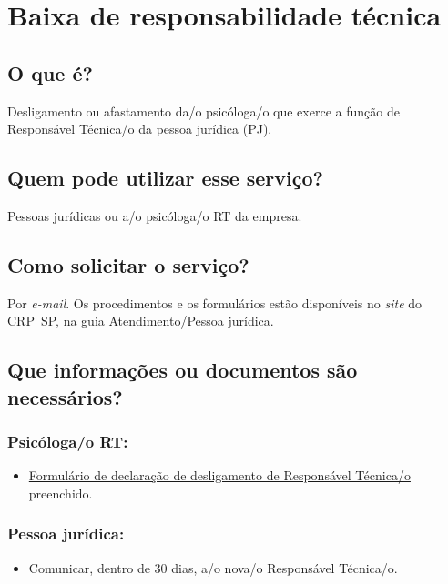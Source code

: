 \chapter{Baixa de responsabilidade técnica}
\label{chap:pj-baixa_rt}

\section{O que é?}

Desligamento ou afastamento da/o psicóloga/o que exerce a função de Responsável Técnica/o da pessoa jurídica (PJ).

\section{Quem pode utilizar esse serviço?}

Pessoas jurídicas ou a/o psicóloga/o RT da empresa.

\section{Como solicitar o serviço?}

Por \emph{e-mail}. Os procedimentos e os formulários estão disponíveis no \emph{site} do CRP~SP, na guia \href{https://www.crpsp.org/pagina/view/30}{Atendimento/Pessoa jurídica}.

\section{Que informações ou documentos são necessários?}

\subsection{Psicóloga/o RT:}

\begin{itemize}
  \item  \hyperref[]{Formulário  de declaração de desligamento de Responsável Técnica/o} preenchido.
\end{itemize}

\subsection{Pessoa jurídica:}

\begin{itemize}
  \item  Comunicar, dentro de 30 dias, a/o nova/o Responsável Técnica/o.
\end{itemize}

